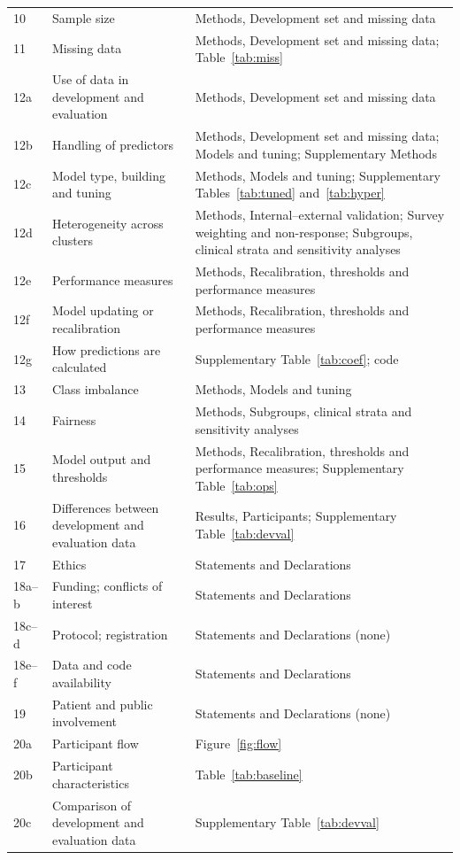 \documentclass[11pt,a4paper]{article}
\begin{document}
\begin{longtable}{p{1.0cm}p{6.4cm}p{7.1cm}}
10 & Sample size & Methods, Development set and missing data \\
11 & Missing data & Methods, Development set and missing data; Table~\ref{tab:miss} \\
12a & Use of data in development and evaluation & Methods, Development set and missing data \\
12b & Handling of predictors & Methods, Development set and missing data; Models and tuning; Supplementary Methods \\
12c & Model type, building and tuning & Methods, Models and tuning; Supplementary Tables~\ref{tab:tuned} and~\ref{tab:hyper} \\
12d & Heterogeneity across clusters & Methods, Internal--external validation; Survey weighting and non-response; Subgroups, clinical strata and sensitivity analyses \\
12e & Performance measures & Methods, Recalibration, thresholds and performance measures \\
12f & Model updating or recalibration & Methods, Recalibration, thresholds and performance measures \\
12g & How predictions are calculated & Supplementary Table~\ref{tab:coef}; code \\
13 & Class imbalance & Methods, Models and tuning \\
14 & Fairness & Methods, Subgroups, clinical strata and sensitivity analyses \\
15 & Model output and thresholds & Methods, Recalibration, thresholds and performance measures; Supplementary Table~\ref{tab:ops} \\
16 & Differences between development and evaluation data & Results, Participants; Supplementary Table~\ref{tab:devval} \\
17 & Ethics & Statements and Declarations \\
18a--b & Funding; conflicts of interest & Statements and Declarations \\
18c--d & Protocol; registration & Statements and Declarations (none) \\
18e--f & Data and code availability & Statements and Declarations \\
19 & Patient and public involvement & Statements and Declarations (none) \\
20a & Participant flow & Figure~\ref{fig:flow} \\
20b & Participant characteristics & Table~\ref{tab:baseline} \\
20c & Comparison of development and evaluation data & Supplementary Table~\ref{tab:devval} \\

\end{longtable}
\end{document}
